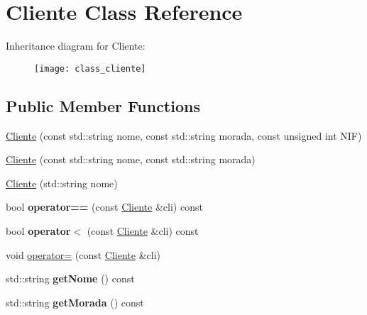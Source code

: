 \hypertarget{class_cliente}{}\section{Cliente Class Reference}
\label{class_cliente}
Inheritance diagram for Cliente\+:\begin{figure}[H]
\begin{center}
\leavevmode
\texttt{[image: class\_cliente]}
\end{center}
\end{figure}
\subsection*{Public Member Functions}
\begin{DoxyCompactItemize}
\item 
\hyperlink{class_cliente_a5957c05b3d3594a7cbd8c088486d14ae}{Cliente} (const std\+::string nome, const std\+::string morada, const unsigned int N\+IF)
\item 
\hyperlink{class_cliente_a030699a841488d4b3dfbedf75834e002}{Cliente} (const std\+::string nome, const std\+::string morada)
\item 
\hyperlink{class_cliente_a17e05e34ce319b738fb68c53e4ded2c3}{Cliente} (std\+::string nome)
\item 
\hypertarget{class_cliente_a7972b72a8288e5dee92b30579017c549}{}\label{class_cliente_a7972b72a8288e5dee92b30579017c549} 
bool {\bfseries operator==} (const \hyperlink{class_cliente}{Cliente} \&cli) const
\item 
\hypertarget{class_cliente_aa1c8490c22c31b6c7ccdb794cadc866d}{}\label{class_cliente_aa1c8490c22c31b6c7ccdb794cadc866d} 
bool {\bfseries operator$<$} (const \hyperlink{class_cliente}{Cliente} \&cli) const
\item 
void \hyperlink{class_cliente_a3aa84b64135b106669724fc08b7cc91f}{operator=} (const \hyperlink{class_cliente}{Cliente} \&cli)
\item 
\hypertarget{class_cliente_abfd45b8b07a8549fe4761d00c76a43c3}{}\label{class_cliente_abfd45b8b07a8549fe4761d00c76a43c3} 
std\+::string {\bfseries get\+Nome} () const
\item 
\hypertarget{class_cliente_af73bfd0b9fc0f7facf4f6d9acbe757b1}{}\label{class_cliente_af73bfd0b9fc0f7facf4f6d9acbe757b1} 
std\+::string {\bfseries get\+Morada} () const
\item 
\hypertarget{class_cliente_a8dedf04f5520b5849ecd70a1c4d07a86}{}\label{class_cliente_a8dedf04f5520b5849ecd70a1c4d07a86} 

\end{DoxyCompactItemize}
